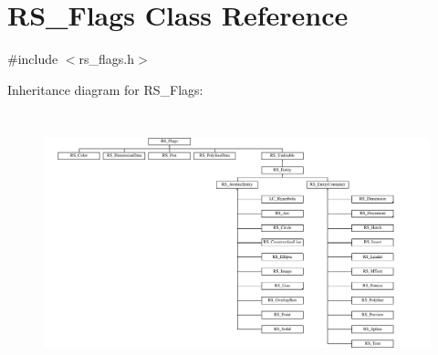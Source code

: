 \hypertarget{classRS__Flags}{\section{R\-S\-\_\-\-Flags Class Reference}
\label{classRS__Flags}
}


{\ttfamily \#include $<$rs\-\_\-flags.\-h$>$}

Inheritance diagram for R\-S\-\_\-\-Flags\-:\begin{figure}[H]
\begin{center}
\leavevmode
\includegraphics[height=7.608696cm]{classRS__Flags}
\end{center}
\end{figure}
